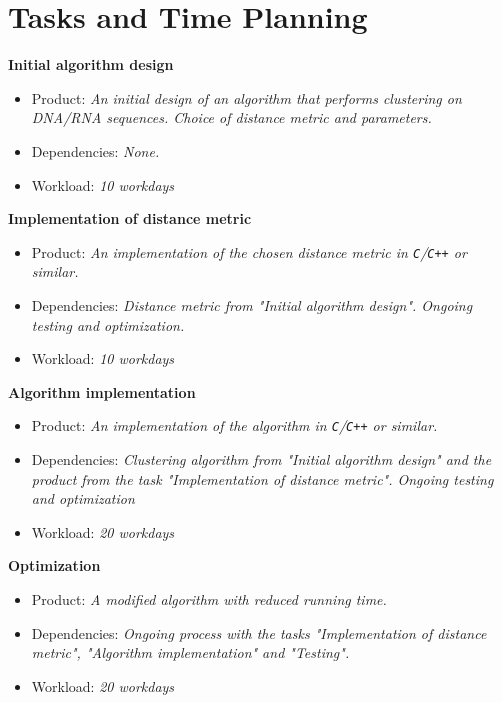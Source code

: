 \documentclass[12pt,a4paper]{article}
\begin{document}

\section{Tasks and Time Planning}
\textbf{Initial algorithm design}
\begin{itemize}
\item Product: \textit{An initial design of an algorithm that performs clustering on DNA/RNA sequences. Choice of distance metric and parameters.}
\item Dependencies: \textit{None.}
\item Workload: \textit{10 workdays}
\end{itemize}

\noindent
\textbf{Implementation of distance metric}
\begin{itemize}
\item Product: \textit{An implementation of the chosen distance metric in \texttt{C}/\texttt{C++} or similar.}
\item Dependencies: \textit{Distance metric from "Initial algorithm design". Ongoing testing and optimization.}
\item Workload: \textit{10 workdays}
\end{itemize}

\noindent
\textbf{Algorithm implementation}
\begin{itemize}
\item Product: \textit{An implementation of the algorithm in \texttt{C}/\texttt{C++} or similar.}
\item Dependencies: \textit{Clustering algorithm from "Initial algorithm design" and the product from the task "Implementation of distance metric". Ongoing testing and optimization}
\item Workload: \textit{20 workdays}
\end{itemize}

\noindent
\textbf{Optimization}
\begin{itemize}
\item Product: \textit{A modified algorithm with reduced running time.}
\item Dependencies: \textit{Ongoing process with the tasks "Implementation of distance metric", "Algorithm implementation" and "Testing".}
\item Workload: \textit{20 workdays}
\end{itemize}
\end{document}
